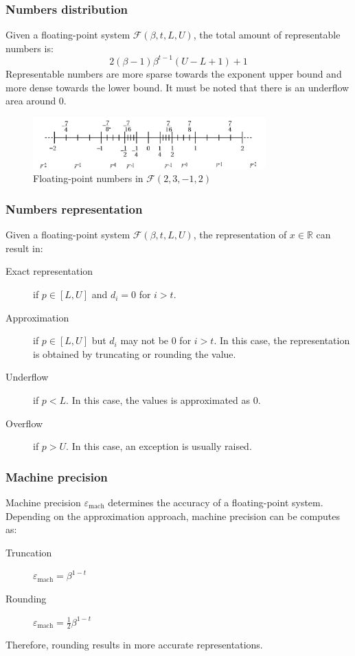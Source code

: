 \subsubsection{Numbers distribution}
Given a floating-point system $\mathcal{F}(\beta, t, L, U)$, the total amount of representable numbers is:
\begin{equation*}
    2(\beta-1) \beta^{t-1} (U-L+1)+1
\end{equation*}
%
Representable numbers are more sparse towards the exponent upper bound and more dense towards the lower bound.
It must be noted that there is an underflow area around 0.
\begin{figure}[h]
    \centering
    \includegraphics[width=0.8\textwidth]{img/floatingpoint_range.png}
    \caption{Floating-point numbers in $\mathcal{F}(2, 3, -1, 2)$}
\end{figure}


\subsubsection{Numbers representation}
Given a floating-point system $\mathcal{F}(\beta, t, L, U)$, the representation of $x \in \mathbb{R}$ can result in:
\begin{description}
    \item[Exact representation] 
        if $p \in [L, U]$ and $d_i=0$ for $i>t$.

    \item[Approximation] 
        if $p \in [L, U]$ but $d_i$ may not be 0 for $i>t$. 
        In this case, the representation is obtained by truncating or rounding the value.

    \item[Underflow] 
        if $p < L$. In this case, the values is approximated as 0.

    \item[Overflow] 
        if $p > U$. In this case, an exception is usually raised.
\end{description}


\subsubsection{Machine precision}
Machine precision $\varepsilon_{\text{mach}}$ determines the accuracy of a floating-point system.
Depending on the approximation approach, machine precision can be computes as:
\begin{description}
    \item[Truncation] $\varepsilon_{\text{mach}} = \beta^{1-t}$
    \item[Rounding] $\varepsilon_{\text{mach}} = \frac{1}{2}\beta^{1-t}$
\end{description}
Therefore, rounding results in more accurate representations.

